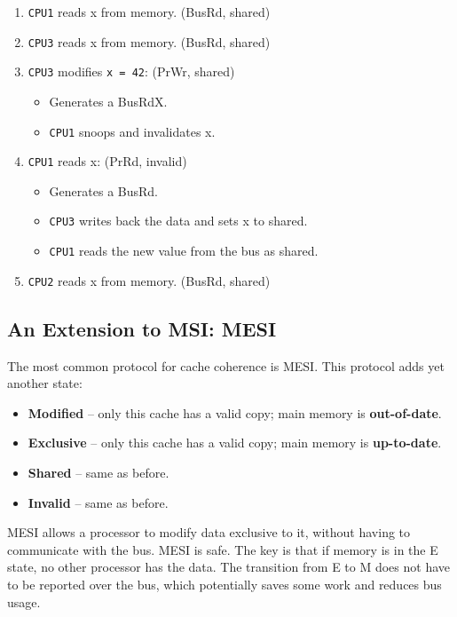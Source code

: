   \begin{enumerate}[noitemsep]
    \item {\tt CPU1} reads x from memory. {(BusRd, shared)}
    \item {\tt CPU3} reads x from memory. {(BusRd, shared)}
    \item {\tt CPU3} modifies {\tt x = 42}: {(PrWr, shared)}
      \begin{itemize}[noitemsep]
        \item {Generates a BusRdX.}
        \item {{\tt CPU1} snoops and invalidates x.}
      \end{itemize}
    \item {\tt CPU1} reads x: {(PrRd, invalid)}
      \begin{itemize}[noitemsep]
        \item {Generates a BusRd.}
        \item {{\tt CPU3} writes back the data and sets x to shared.}
        \item {{\tt CPU1} reads the new value from the bus as shared.}
      \end{itemize}
    \item {\tt CPU2} reads x from memory. {(BusRd, shared)}
  \end{enumerate}

\subsection*{An Extension to MSI: MESI}
    The most common protocol for cache coherence is MESI.
    This protocol adds yet another state: \vspace{-1em}
      \begin{itemize}[noitemsep]
        \item {\bf Modified} -- only this cache has a valid copy; 
 main memory is {\bf out-of-date}.
        \item {\bf Exclusive} -- only this cache has a valid copy; 
 main memory is {\bf up-to-date}.
        \item {\bf Shared} -- same as before.
        \item {\bf Invalid} -- same as before.
      \end{itemize}

    MESI allows a processor to modify data exclusive to it, without
    having to communicate with the bus. MESI is safe. The key is that
    if memory is in the E state, no other processor has the data. The transition from E to M does not have to be reported over the bus, which potentially saves some work and reduces bus usage. 

